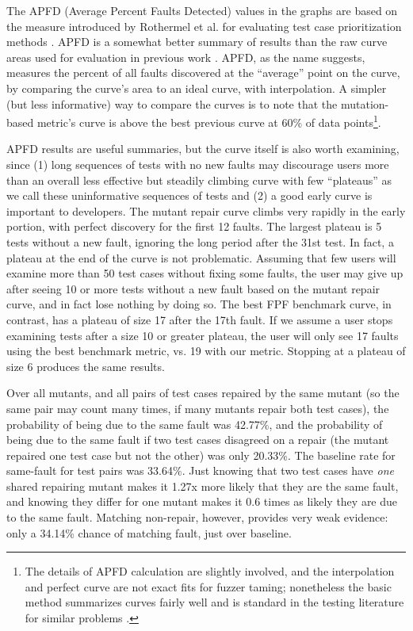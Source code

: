 The APFD (Average Percent Faults Detected) values in the graphs are based on the measure  introduced by Rothermel et al. for evaluating test case prioritization methods \cite{APFD}.  APFD is a somewhat better summary of results than the raw curve areas used for evaluation in previous work \cite{PLDI13}.  APFD, as the name suggests, measures the percent of all faults discovered at the ``average'' point on the curve, by comparing the curve's area to an ideal curve, with interpolation.  A simpler (but less informative) way to compare the curves is to note that the mutation-based metric's curve is above the best previous curve at 60\% of data points\footnote{The details of APFD calculation are slightly involved, and the interpolation and perfect curve are not exact fits for fuzzer taming; nonetheless the basic method summarizes curves fairly well and is standard in the testing literature for similar problems \cite{issta14}.}. 

APFD results are useful summaries, but the curve itself is also worth examining, since (1) long sequences of tests with no new faults may discourage users more than an overall less effective but steadily climbing curve with few ``plateaus'' as we call these uninformative sequences of tests and (2) a good early curve is important to developers.  The mutant repair curve climbs very rapidly in the early portion, with perfect discovery for the first 12 faults. The largest plateau is 5 tests without a new fault, ignoring the long period after the 31st test.  In fact, a plateau at the end of the curve is not problematic.  Assuming that few users will examine more than 50 test cases without fixing some faults, the user may give up after seeing 10 or more tests without a new fault based on the mutant repair curve, and in fact lose nothing by doing so.  The best FPF benchmark curve, in contrast, has a plateau of size 17 after the 17th fault.  If we assume a user stops examining tests after a size 10 or greater plateau, the user will only see 17 faults using the best benchmark metric, vs. 19 with our metric.  Stopping at a plateau of size 6 produces the same results.

Over all mutants, and all pairs of test cases repaired by the same mutant (so the same pair may count many times, if many mutants repair both test cases), the probability of being due to the same fault was 42.77\%, and the probability of being due to the same fault if two test cases disagreed on a repair (the mutant repaired one test case but not the other) was only 20.33\%.  The baseline rate for same-fault for test pairs was 33.64\%.  Just knowing that two test cases have \emph{one} shared repairing mutant makes it 1.27x more likely that they are the same fault, and knowing they differ for one mutant makes it 0.6 times as likely they are due to the same fault.  Matching non-repair, however, provides very weak evidence:  only a 34.14\% chance of matching fault, just over baseline.

